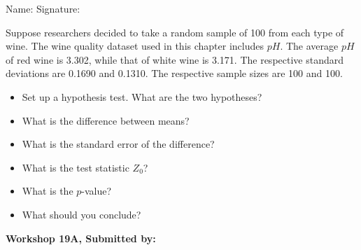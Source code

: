 \documentclass[11pt]{book}\usepackage[]{graphicx}\usepackage[]{color}
\begin{document}
\begin{exercises}
\begin{exercise}
\begin{center}
{{\vspace{4mm}
Name: \underline{\phantom{xxxxxxxxxxxxxxxxxxxxxxxx}} Signature: \underline{\phantom{xxxxxxxxxxxxxxxxxxxxxxxx}}
 }}
\end{center}   %

Suppose researchers decided to take a random sample of 100 from each type of wine.  The wine quality dataset used in this chapter includes $pH$. The average $pH$ of red wine is 3.302, while that of white wine is 3.171. The respective standard deviations are 0.1690 and 0.1310. The respective sample sizes are 100 and 100.

\begin{itemize}
  \item Set up a hypothesis test. What are the two hypotheses?
  \item What is the difference between means?
  \item What is the standard error of the difference?
  \item What is the test statistic $Z_0$?
  \item What is the $p$-value?
  \item What should you conclude?
\end{itemize}

\end{exercise}
\begin{solution}  %


\end{solution}


\clearpage

    \begin{exercise}  %

    \begin{center}
\begin{flushleft}\textbf{\large \hfill Workshop 19A, Submitted by: }\end{flushleft}


\end{center}
\end{exercise}
\end{exercises}
\end{document}
